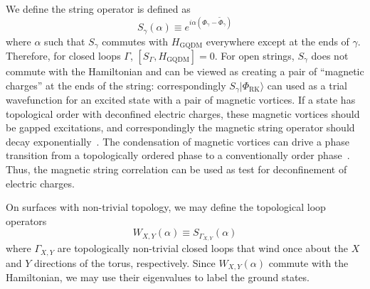 \documentclass[twocolumn,prb,aps,floatfix,superscriptaddress]{revtex4-1}
\newcommand{\ket}[1]{| #1 \rangle}
\newcommand{\RK}{\mathrm{RK}}
\newcommand{\HGQDM}{H_\mathrm{GQDM}}
\begin{document}
We define the string operator is defined as
\begin{equation}
S_\gamma \left( \alpha \right) \equiv e^{i \alpha \left( \Phi_\gamma - \tilde{\Phi}_\gamma \right)} \label{eq:Sgamma}
\end{equation}
where $\alpha$ such that $S_\gamma$ commutes with $\HGQDM$ everywhere except at the ends of $\gamma$. Therefore, for closed loops $\Gamma$, $[ S_\Gamma,\HGQDM]=0$. For open strings, $S_\gamma$ does not commute with the Hamiltonian and can be viewed as creating a pair of ``magnetic charges'' at the ends of the string: correspondingly $S_\gamma \ket{\Phi_{\RK}}$ can used as a trial wavefunction for an excited state with a pair of magnetic vortices. If a state has topological order with deconfined electric charges, these magnetic vortices should be gapped excitations, and correspondingly the magnetic string operator should decay exponentially~\cite{Read1989a,Senthil2000,Senthil2001e}. The condensation of magnetic vortices can drive a phase transition from a topologically ordered phase to a conventionally order phase~\cite{Jalabert1991,Ralko2007,Huh2011}. Thus, the magnetic string correlation can be used as test for deconfinement of electric charges.

On surfaces with non-trivial topology, we may define the topological loop operators
\begin{equation}
W_{X,Y} \left( \alpha \right) \equiv S_{\Gamma_{X,Y}} \left( \alpha \right)
\end{equation}
where $\Gamma_{X,Y}$ are topologically non-trivial closed loops that wind once about the $X$ and $Y$ directions of the torus, respectively. Since $W_{X,Y} (\alpha)$ commute with the Hamiltonian, we may use their eigenvalues to label the ground states.
\end{document}
